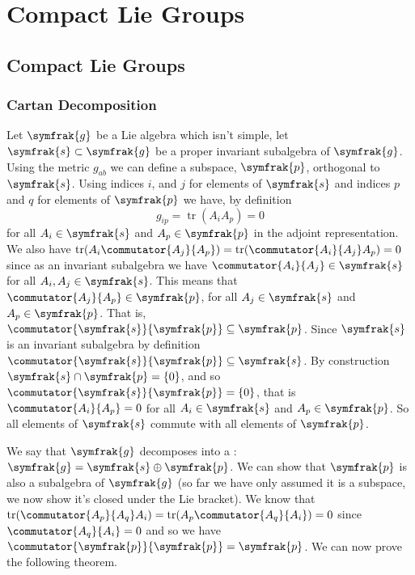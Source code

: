 \documentclass[fleqn]{NotesClass}
\renewcommand{\lie}[1]{\symfrak{#1}}
\DeclareMathOperator{\tr}{tr}
\begin{document}
    \part{Compact Lie Groups}
    \chapter{Compact Lie Groups}
    \section{Cartan Decomposition}
    Let \(\lie{g}\) be a Lie algebra which isn't simple, let \(\lie{s} \subset \lie{g}\) be a proper invariant subalgebra of \(\lie{g}\).
    Using the metric \(g_{ab}\) we can define a subspace, \(\lie{p}\), orthogonal to \(\lie{s}\).
    Using indices \(i\), and \(j\) for elements of \(\lie{s}\) and indices \(p\) and \(q\) for elements of \(\lie{p}\) we have, by definition
    \begin{equation}
        g_{ip} = \tr(A_iA_p) = 0
    \end{equation}
    for all \(A_i \in \lie{s}\) and \(A_p \in \lie{p}\) in the adjoint representation.
    We also have \(\tr(A_i \commutator{A_j}{A_p}) = \tr(\commutator{A_i}{A_j} A_p) = 0\) since as an invariant subalgebra we have \(\commutator{A_i}{A_j} \in \lie{s}\) for all \(A_i, A_j \in \lie{s}\).
    This means that \(\commutator{A_j}{A_p} \in \lie{p}\), for all \(A_j \in \lie{s}\) and \(A_p \in \lie{p}\).
    That is, \(\commutator{\lie{s}}{\lie{p}} \subseteq \lie{p}\).
    Since \(\lie{s}\) is an invariant subalgebra by definition \(\commutator{\lie{s}}{\lie{p}} \subseteq \lie{s}\).
    By construction \(\lie{s} \cap \lie{p} = \{0\}\), and so \(\commutator{\lie{s}}{\lie{p}} = \{0\}\), that is \(\commutator{A_i}{A_p} = 0\) for all \(A_i \in \lie{s}\) and \(A_p \in \lie{p}\).
    So all elements of \(\lie{s}\) commute with all elements of \(\lie{p}\).
    
    We say that \(\lie{g}\) decomposes into a : \(\lie{g} = \lie{s} \oplus \lie{p}\).
    We can show that \(\lie{p}\) is also a subalgebra of \(\lie{g}\) (so far we have only assumed it is a subspace, we now show it's closed under the Lie bracket).
    We know that \(\tr(\commutator{A_p}{A_q}A_i) = \tr(A_p\commutator{A_q}{A_i}) = 0\) since \(\commutator{A_q}{A_i} = 0\) and so we have \(\commutator{\lie{p}}{\lie{p}} = \lie{p}\).
    We can now prove the following theorem.
    
\end{document}
